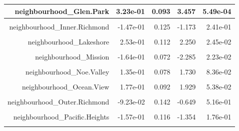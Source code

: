 \documentclass[justified, 11pt]{scrartcl}\usepackage[]{graphicx}\usepackage[]{xcolor}
\newenvironment{knitrout}{}{} %
\begin{document}
\begin{knitrout}
\begin{table}
\begin{tabular}{r|r|r|r|r}
\hline
neighbourhood\_Glen.Park & 3.23e-01 & 0.093 & 3.457 & 5.49e-04\\
\hline
\cellcolor{gray!6}{neighbourhood\_Haight.Ashbury} & \cellcolor{gray!6}{3.51e-02} & \cellcolor{gray!6}{0.099} & \cellcolor{gray!6}{0.355} & \cellcolor{gray!6}{7.23e-01}\\
\hline
neighbourhood\_Inner.Richmond & -1.47e-01 & 0.125 & -1.173 & 2.41e-01\\
\hline
\cellcolor{gray!6}{neighbourhood\_Inner.Sunset} & \cellcolor{gray!6}{-1.81e-01} & \cellcolor{gray!6}{0.112} & \cellcolor{gray!6}{-1.619} & \cellcolor{gray!6}{1.05e-01}\\
\hline
neighbourhood\_Lakeshore & 2.53e-01 & 0.112 & 2.250 & 2.45e-02\\
\hline
\cellcolor{gray!6}{neighbourhood\_Marina} & \cellcolor{gray!6}{-2.04e-01} & \cellcolor{gray!6}{0.125} & \cellcolor{gray!6}{-1.625} & \cellcolor{gray!6}{1.04e-01}\\
\hline
neighbourhood\_Mission & -1.64e-01 & 0.072 & -2.285 & 2.23e-02\\
\hline
\cellcolor{gray!6}{neighbourhood\_Nob.Hill} & \cellcolor{gray!6}{-1.65e-01} & \cellcolor{gray!6}{0.103} & \cellcolor{gray!6}{-1.600} & \cellcolor{gray!6}{1.10e-01}\\
\hline
neighbourhood\_Noe.Valley & 1.35e-01 & 0.078 & 1.730 & 8.36e-02\\
\hline
\cellcolor{gray!6}{neighbourhood\_North.Beach} & \cellcolor{gray!6}{1.12e-01} & \cellcolor{gray!6}{0.118} & \cellcolor{gray!6}{0.951} & \cellcolor{gray!6}{3.42e-01}\\
\hline
neighbourhood\_Ocean.View & 1.77e-01 & 0.092 & 1.929 & 5.38e-02\\
\hline
\cellcolor{gray!6}{neighbourhood\_Outer.Mission} & \cellcolor{gray!6}{-6.96e-02} & \cellcolor{gray!6}{0.084} & \cellcolor{gray!6}{-0.833} & \cellcolor{gray!6}{4.05e-01}\\
\hline
neighbourhood\_Outer.Richmond & -9.23e-02 & 0.142 & -0.649 & 5.16e-01\\
\hline
\cellcolor{gray!6}{neighbourhood\_Outer.Sunset} & \cellcolor{gray!6}{-2.96e-02} & \cellcolor{gray!6}{0.127} & \cellcolor{gray!6}{-0.233} & \cellcolor{gray!6}{8.16e-01}\\
\hline
neighbourhood\_Pacific.Heights & -1.57e-01 & 0.116 & -1.354 & 1.76e-01\\
\hline
\cellcolor{gray!6}{neighbourhood\_Parkside} & \cellcolor{gray!6}{1.06e-01} & \cellcolor{gray!6}{0.119} & \cellcolor{gray!6}{0.894} & \cellcolor{gray!6}{3.72e-01}\\

\end{tabular}
\end{table}
\end{knitrout}
\end{document}
